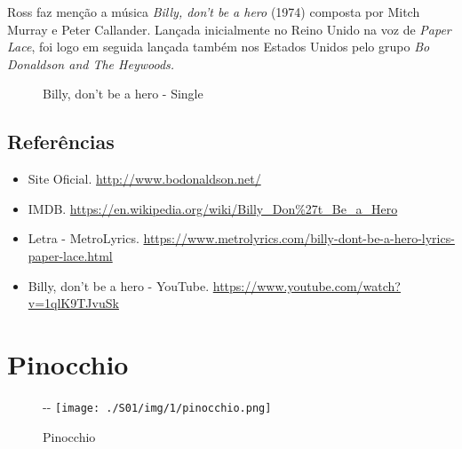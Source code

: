 Ross faz menção a música \emph{Billy, don't be a hero} (1974) composta
por Mitch Murray e Peter Callander. Lançada inicialmente no Reino Unido
na voz de \emph{Paper Lace}, foi logo em seguida lançada também nos
Estados Unidos pelo grupo \emph{Bo Donaldson and The Heywoods.}

\begin{figure}
  \centering
    \caption{Billy, don’t be a hero - Single\label{fig:billy-don-t-be-a-hero-single}}
\end{figure}

\hypertarget{referuxeancias-6}{%
\subsection{Referências}\label{referuxeancias-6}}

\begin{itemize}
\tightlist
\item
  \sloppy Site Oficial. \url{http://www.bodonaldson.net/}
\item
  \sloppy IMDB. \url{https://en.wikipedia.org/wiki/Billy_Don%27t_Be_a_Hero}
\item
  \sloppy Letra - MetroLyrics. \url{https://www.metrolyrics.com/billy-dont-be-a-hero-lyrics-paper-lace.html}
\item
  \sloppy Billy, don’t be a hero - YouTube. \url{https://www.youtube.com/watch?v=1qlK9TJvuSk}
\end{itemize}

\hypertarget{pinocchio}{%
\section{Pinocchio}\label{pinocchio}}

\begin{figure}[!ht]
  \begin{adjustwidth}{-\oddsidemargin-1in}{-\rightmargin}
    \centering
    \texttt{[image: ./S01/img/1/pinocchio.png]}
    \caption{Pinocchio\label{fig:pinocchio}}
  \end{adjustwidth}
\end{figure}

